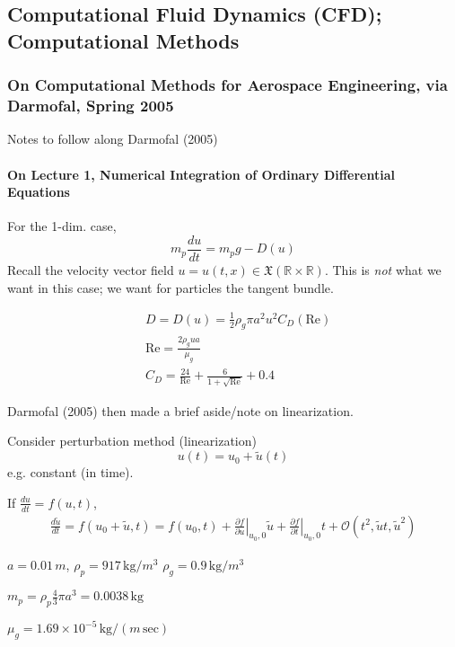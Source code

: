 \documentclass[10pt]{amsart}
\begin{document}
\begin{multicols*}{2}
\part{Computational Fluid Dynamics (CFD); Computational Methods} 

\section{On Computational Methods for Aerospace Engineering, via Darmofal, Spring 2005}

Notes to follow along Darmofal (2005) \cite{Darm2005}

\subsection{On Lecture 1, Numerical Integration of Ordinary Differential Equations}

For the 1-dim. case,
\[
m_p \frac{du}{dt} = m_pg - D(u)
\]
Recall the velocity vector field $u=u(t,x) \in \mathfrak{X}(\mathbb{R}\times \mathbb{R})$.  This is \emph{not} what we want in this case; we want for particles the tangent bundle.

\[
\begin{aligned}
  & D = D(u) = \frac{1}{2} \rho_g \pi a^2 u^2 C_D(\text{Re}) \\ 
  & \text{Re} = \frac{2\rho_g u a}{\mu_g} \\
  & C_D = \frac{24}{\text{Re}} + \frac{6}{1+ \sqrt{\text{Re}} } + 0.4
\end{aligned}
\]

Darmofal (2005) \cite{Darm2005} then made a brief aside/note on linearization.

Consider perturbation method (linearization)
\[
u(t) = u_0 + \widetilde{u}(t)
\]
e.g. constant (in time).

If $\frac{du}{dt} = f(u,t)$,
\[
\begin{gathered}
  \frac{d\widetilde{u}}{dt} = f(u_0 + \widetilde{u},t) = f(u_0,t) + \left. \frac{ \partial f}{ \partial u} \right|_{u_0,0} \widetilde{u} + \left. \frac{ \partial f}{ \partial t} \right|_{u_0,0} t + \mathcal{O}(t^2, \widetilde{u}t, \widetilde{u}^2 )
  \end{gathered}
\]

$a = 0.01 \, m$, $\rho_p = 917 \, \text{kg}/m^3$ \qquad $\rho_g = 0.9 \, \text{kg}/m^3$

$m_p = \rho_p \frac{4}{3} \pi a^3 = 0.0038 \, \text{kg}$

$\mu_g = 1.69 \times 10^{-5} \, \text{kg}/(m \, \text{sec})$


\end{multicols*}
\end{document}
